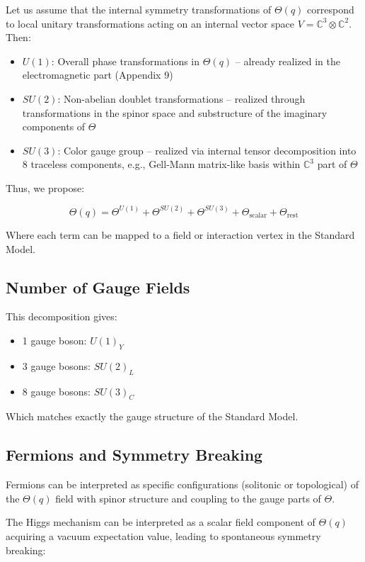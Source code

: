 Let us assume that the internal symmetry transformations of \(\Theta(q)\) correspond to local unitary transformations
acting on an internal vector space \(V = \mathbb{C}^3 \otimes \mathbb{C}^2\). Then:

\begin{itemize}
  \item \(U(1)\): Overall phase transformations in \(\Theta(q)\) – already realized in the electromagnetic part (Appendix 9)
  \item \(SU(2)\): Non-abelian doublet transformations – realized through transformations in the spinor space and
    substructure of the imaginary components of \(\Theta\)
  \item \(SU(3)\): Color gauge group – realized via internal tensor decomposition into 8 traceless components,
    e.g., Gell-Mann matrix-like basis within \(\mathbb{C}^3\) part of \(\Theta\)
\end{itemize}

Thus, we propose:

\[
\Theta(q) = \Theta^{U(1)} + \Theta^{SU(2)} + \Theta^{SU(3)} + \Theta_{\text{scalar}} + \Theta_{\text{rest}}
\]

Where each term can be mapped to a field or interaction vertex in the Standard Model.

\subsection*{Number of Gauge Fields}

This decomposition gives:
\begin{itemize}
  \item 1 gauge boson: \(U(1)_Y\)
  \item 3 gauge bosons: \(SU(2)_L\)
  \item 8 gauge bosons: \(SU(3)_C\)
\end{itemize}

Which matches exactly the gauge structure of the Standard Model.

\subsection*{Fermions and Symmetry Breaking}

Fermions can be interpreted as specific configurations (solitonic or topological) of the \(\Theta(q)\) field
with spinor structure and coupling to the gauge parts of \(\Theta\).

The Higgs mechanism can be interpreted as a scalar field component of \(\Theta(q)\) acquiring a vacuum expectation value,
leading to spontaneous symmetry breaking:


